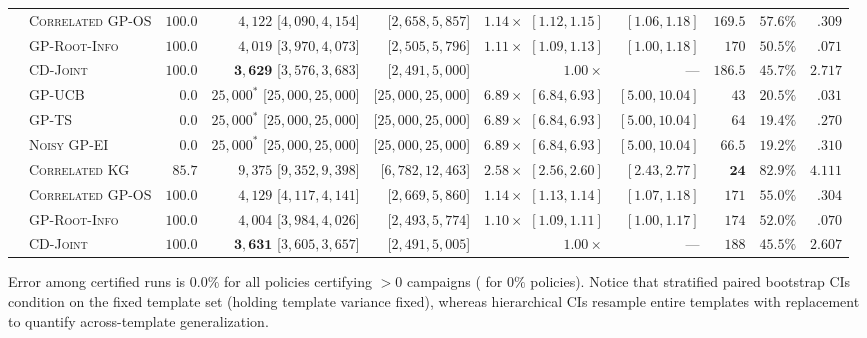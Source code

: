 \documentclass{article}
\theoremstyle{plain}
\theoremstyle{definition}
\begin{document}
\begin{table}[!htbp]
{\begin{tabular}{@{}llrrrrrrrr@{}}
 & \textsc{Correlated GP-OS} & $\mathbf{100.0}$ & $4{,}122$ [$4{,}090,4{,}154$] & [$2{,}658,5{,}857$] & $1.14\times$ $[1.12,1.15]$ & $[1.06,1.18]$ & $169.5$ & $57.6\%$ & $.309$ \\
 & \textsc{GP-Root-Info} & $\mathbf{100.0}$ & $4{,}019$ [$3{,}970,4{,}073$] & [$2{,}505,5{,}796$] & $1.11\times$ $[1.09,1.13]$ & $[1.00,1.18]$ & $170$ & $50.5\%$ & $.071$ \\
 & \textsc{CD-Joint} & $\mathbf{100.0}$ & $\mathbf{3{,}629}$ [$3{,}576,3{,}683$] & [$2{,}491,5{,}000$] & $1.00\times$ & --- & $186.5$ & $45.7\%$ & $2.717$ \\
\midrule
{}
 & \textsc{GP-UCB} & $0.0$ & $25{,}000^*$ [$25{,}000,25{,}000$] & [$25{,}000,25{,}000$] & $6.89\times$ $[6.84,6.93]$ & $[5.00,10.04]$ & $43$ & $20.5\%$ & $.031$ \\
 & \textsc{GP-TS} & $0.0$ & $25{,}000^*$ [$25{,}000,25{,}000$] & [$25{,}000,25{,}000$] & $6.89\times$ $[6.84,6.93]$ & $[5.00,10.04]$ & $64$ & $19.4\%$ & $.270$ \\
 & \textsc{Noisy GP-EI} & $0.0$ & $25{,}000^*$ [$25{,}000,25{,}000$] & [$25{,}000,25{,}000$] & $6.89\times$ $[6.84,6.93]$ & $[5.00,10.04]$ & $66.5$ & $19.2\%$ & $.310$ \\
 & \textsc{Correlated KG} & $85.7$ & $9{,}375$ [$9{,}352,9{,}398$] & [$6{,}782,12{,}463$] & $2.58\times$ $[2.56,2.60]$ & $[2.43,2.77]$ & $\mathbf{24}$ & $82.9\%$ & $4.111$ \\
 & \textsc{Correlated GP-OS} & $\mathbf{100.0}$ & $4{,}129$ [$4{,}117,4{,}141$] & [$2{,}669,5{,}860$] & $1.14\times$ $[1.13,1.14]$ & $[1.07,1.18]$ & $171$ & $55.0\%$ & $.304$ \\
 & \textsc{GP-Root-Info} & $\mathbf{100.0}$ & $4{,}004$ [$3{,}984,4{,}026$] & [$2{,}493,5{,}774$] & $1.10\times$ $[1.09,1.11]$ & $[1.00,1.17]$ & $174$ & $52.0\%$ & $.070$ \\
 & \textsc{CD-Joint} & $\mathbf{100.0}$ & $\mathbf{3{,}631}$ [$3{,}605,3{,}657$] & [$2{,}491,5{,}005$] & $1.00\times$ & --- & $188$ & $45.5\%$ & $2.607$ \\
\bottomrule
\end{tabular}%
}
\par\vspace{2pt}\noindent
\parbox{\linewidth}{\scriptsize Error among certified runs is $0.0\%$ for all policies certifying $>0$ campaigns (\text{---} for $0\%$ policies). Notice that stratified paired bootstrap CIs condition on the fixed template set (holding template variance fixed), whereas hierarchical CIs resample entire templates with replacement to quantify across-template generalization.}
\end{table}
\end{document}
